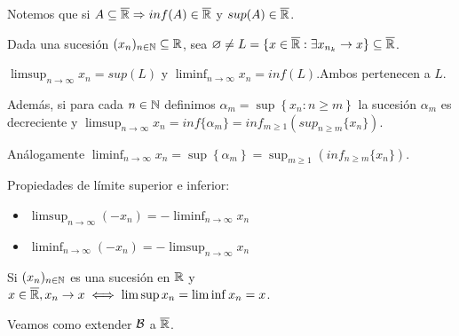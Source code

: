 Notemos que si \(A \subseteq \overline{\mathbb{R}} \Rightarrow inf(A) \in \overline{\mathbb{R}}\) y \(sup(A) \in \overline{\mathbb{R}}\).

Dada una sucesión \((x_n)_{n \in \mathbb{N}} \subseteq \mathbb{R}\), sea \(\varnothing \neq L = \{ x \in \overline{\mathbb{R}} : \exists x_{n_k} \to x \} \subseteq \overline{\mathbb{R}}\).

\begin{definition}
    \(\limsup_{n \to \infty} x_n = sup(L)\) y \(\liminf_{n \to \infty} x_n = inf(L)\).Ambos pertenecen a \(L\).

    Además, si para cada \(n \in \mathbb{N}\) definimos \(\alpha_m = \sup \left\{ x_n : n \geq m \right\}\) la sucesión \(\alpha_m\) es decreciente y
    \(\limsup_{n \to \infty} x_n = inf\{\alpha_m\} = inf_{m \geq 1} ( sup_{n \geq m}\{x_n\} )\).

    Análogamente \(\liminf_{n \to \infty} x_n = \sup\left\{\alpha_m\right\} = \sup_{m \geq 1} ( inf_{n \geq m}\{x_n\} )\).
\end{definition}

\begin{prop}
    Propiedades de límite superior e inferior:
    \begin{itemize}
        \item \(\limsup_{n \to \infty} (- x_n) = - \liminf_{n \to \infty} x_n\)
        \item \(\liminf_{n \to \infty} (- x_n) = - \limsup_{n \to \infty} x_n\)
    \end{itemize}
\end{prop}

\begin{note}
    Si \((x_n)_{n \in \mathbb{N}}\) es una sucesión en \(\mathbb{R}\) y \(x \in \overline{\mathbb{R}}, x_n \to x \iff \limsup x_n = \liminf x_n = x\).
\end{note}

Veamos como extender \(\mathcal{B}\) a \(\overline{\mathbb{R}}\).

